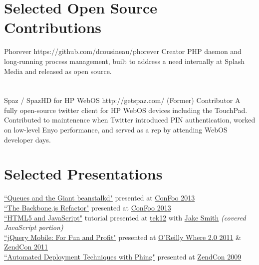 \documentclass{resume}
\begin{document}
\section{Selected Open Source Contributions}

\project
	{Phorever}
	{https://github.com/dcousineau/phorever}
	{Creator}
	{PHP daemon and long-running process management, built to address a need internally at Splash Media and released as open source.}
\\ \\ \\
\project
	{Spaz / SpazHD for HP WebOS}
	{http://getspaz.com/}
	{\small{(Former)} \normalsize{Contributor}}
	{A fully open-source twitter client for HP WebOS devices including the TouchPad. Contributed to maintenence when Twitter introduced PIN authentication, worked on low-level Enyo performance, and served as a rep by attending WebOS developer days.}

\section{Selected Presentations}

\begin{spacing}{1.25}
\href{https://speakerdeck.com/dcousineau/queues-and-the-giant-beanstalkd}{``Queues and the Giant beanstalkd"} presented at \href{http://confoo.ca/}{ConFoo 2013}\\
\href{https://speakerdeck.com/dcousineau/the-backbone-dot-js-refactor}{``The Backbone.js Refactor"} presented at \href{http://confoo.ca/}{ConFoo 2013}\\
\href{https://speakerdeck.com/u/dcousineau/p/html5-and-javascript-part-deux-javascript}{``HTML5 and JavaScript"} tutorial presented at \href{http://tek12.phparch.com/talks/#HTML5-and-Javascript-for-the-PHP-Developer}{tek12} with \href{http://jakefolio.com/}{Jake Smith} \emph{(covered JavaScript portion)}
\\
\href{http://www.slideshare.net/eljefe/jquery-mobile-for-fun-and-profit}{``jQuery Mobile: For Fun and Profit"} presented at \href{http://whereconf.com/where2011/public/schedule/speaker/110352}{O'Reilly Where 2.0 2011} \& \href{http://zendcon.com/2011/speaker/#4054}{ZendCon 2011}
\\
\href{http://www.slideshare.net/eljefe/automated-deployment-with-phing}{``Automated Deployment Techniques with Phing"} presented at \href{http://zendcon.com/2009/speakers#4054}{ZendCon 2009}
\end{spacing}
\end{document}

